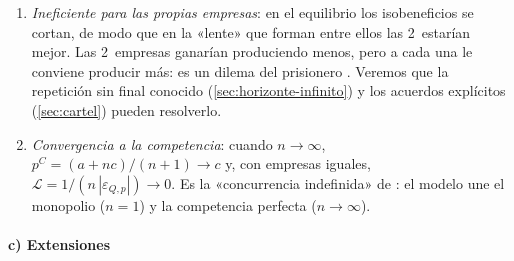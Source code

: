 \documentclass[11pt]{article}
\begin{document}
\begin{enumerate}
\begin{itemize}
  \end{itemize}
\item \emph{Ineficiente para las propias empresas}: en el equilibrio los isobeneficios se cortan, de modo que en la «lente» que forman entre ellos las 2~estarían mejor. Las 2~empresas ganarían produciendo menos, pero a cada una le conviene producir más: es un dilema del prisionero . Veremos que la repetición sin final conocido (\ref{sec:horizonte-infinito}) y los acuerdos explícitos (\ref{sec:cartel}) pueden resolverlo.
\item \emph{Convergencia a la competencia}: cuando $n\to\infty$, $p^C=(a+nc)/(n+1)\to c$ y, con empresas iguales, $\mathcal{L}=1/(n\,|\varepsilon_{Q,p}|)\to0$. Es la «concurrencia indefinida» de \textcite[cap.~8]{Cournot1838Recherches}: el modelo une el monopolio ($n=1$) y la competencia perfecta ($n\to\infty$).
\end{enumerate}

\paragraph{c) Extensiones}
\end{document}

